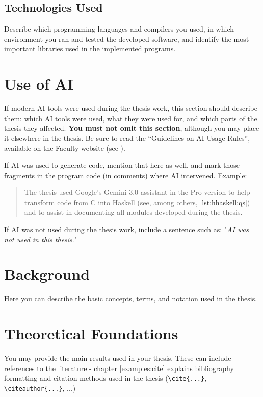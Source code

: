 \subsection*{Technologies Used}

Describe which programming languages and compilers you used,
in which environment you ran and tested the developed software, and identify the most important libraries used in the implemented programs.

\section{Use of AI}

If modern AI tools were used during the thesis work,
this section should describe them: which AI tools were used, what they were used for, and which parts of the thesis they affected. \textbf{You must not omit this section}, although you may place it elsewhere in the thesis.
Be sure to read the ``Guidelines on AI Usage Rules'', available on the Faculty website (see \cite{WITWytyczneSI}).\par

If AI was used to generate code, mention that here as well, and mark those fragments in the program code (in comments) where AI intervened. Example:

\begin{quote}
  The thesis used Google's Gemini 3.0 assistant in the Pro version to help transform code from C into Haskell (see, among others, \cref{lst:hhaskell:qs}) and to assist in documenting all modules developed during the thesis.
\end{quote}

If AI was not used during the thesis work, include a sentence such as:
"\textit{AI was not used in this thesis}."


\section{Background}
\label{chapt1:sec:intro}

Here you can describe the basic concepts, terms, and notation used in the thesis.

\section{Theoretical Foundations}

You may provide the main results used in your thesis.
These can include references to the literature - chapter \ref{examples:cite} explains bibliography formatting and citation methods used in the thesis (\verb|\cite{...}|, \verb|\citeauthor{...}|, ...)
